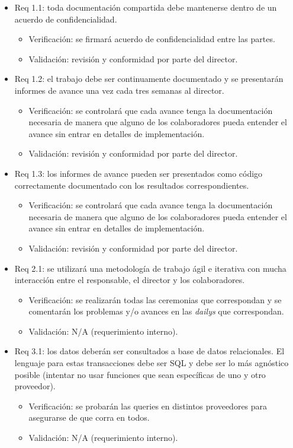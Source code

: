 \documentclass[
11pt, %
]{charter}
\begin{document}
\begin{itemize} 

\item Req 1.1: toda documentación compartida debe mantenerse dentro de un acuerdo de confidencialidad.
\begin{itemize}
	\item Verificación: se firmará acuerdo de confidencialidad entre las partes. 
	\item Validación: revisión y conformidad por parte del director.
\end{itemize}

\item Req 1.2: el trabajo debe ser continuamente documentado y se presentarán informes de avance una vez cada tres semanas al director.
\begin{itemize}
	\item Verificación: se controlará que cada avance tenga la documentación necesaria de manera que alguno de los colaboradores pueda entender el avance sin entrar en detalles de implementación. 
	\item Validación: revisión y conformidad por parte del director.
\end{itemize}

\item Req 1.3: los informes de avance pueden ser presentados como código correctamente documentado con los resultados correspondientes.
\begin{itemize}
	\item Verificación: se controlará que cada avance tenga la documentación necesaria de manera que alguno de los colaboradores pueda entender el avance sin entrar en detalles de implementación. 
	\item Validación: revisión y conformidad por parte del director.
\end{itemize}

\item Req 2.1: se utilizará una metodología de trabajo  ágil e iterativa con mucha interacción entre el responsable, el director y los colaboradores.
\begin{itemize}
	\item Verificación: se realizarán todas las ceremonias que correspondan y se comentarán los problemas y/o avances en las \emph{dailys} que correspondan.
	\item Validación: N/A (requerimiento interno).
\end{itemize}

\item Req 3.1: los datos deberán ser consultados a base de datos relacionales. El lenguaje para estas transacciones debe ser SQL y debe ser lo más agnóstico posible (intentar no usar funciones que sean específicas de uno y otro proveedor).
\begin{itemize}
	\item Verificación: se probarán las queries en distintos proveedores para asegurarse de que corra en todos.
	\item Validación: N/A (requerimiento interno).
\end{itemize}


\end{itemize}
\end{document}
